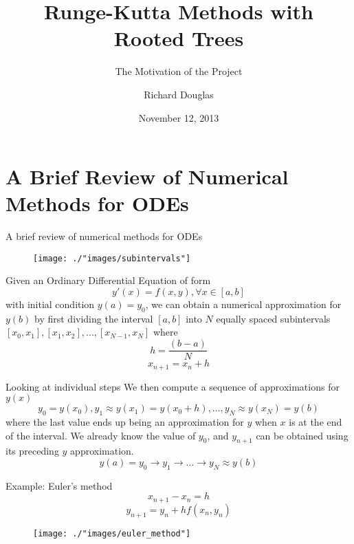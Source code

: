 \documentclass[12pt]{beamer}
\begin{document}
\title[RK Methods with Trees]{Runge-Kutta Methods with Rooted Trees}
\subtitle[motivation of project]{The Motivation of the Project}
\author[R. Douglas]{Richard Douglas}
\date[November 2013]{November 12, 2013}


\begin{frame}
  \titlepage
\end{frame}

\section[Review of Numerical Methods]{A Brief Review of Numerical Methods for ODEs}
\begin{frame}{A brief review of numerical methods for ODEs}
  \begin{figure}
    \centering
    \texttt{[image: ./"images/subintervals"]}
  \end{figure}
  Given an Ordinary Differential Equation of form
  $$y'(x) = f(x,y),  \forall x \in [a,b]$$
  with initial condition $y(a) = y_0$, \pause
  we can obtain a numerical approximation for $y(b)$ by first dividing the interval $[a,b]$ into $N$   
  equally spaced subintervals $[x_0,x_1], [x_1,x_2], ..., [x_{N-1},x_N]$ where
  $$h = \frac{(b - a)}{N}$$
  $$x_{n+1} = x_n + h$$
\end{frame}

\begin{frame}{Looking at individual steps}
  We then compute a sequence of approximations for $y(x)$ 
  $$y_0 = y(x_0), y_1 \approx y(x_1) = y(x_0 + h), \dots, y_N \approx y(x_N) = y(b)$$
  where the last value ends up being an approximation for $y$ when $x$ is at the end of the  
  interval. \newline
  \newline
  \pause
  We already know the value of $y_0$, \pause and $y_{n+1}$ can be obtained using its preceding 
  $y$ approximation.
  \pause
  $$y(a) = y_0 \to y_1\to \dots \to y_N \approx y(b)$$
\end{frame}

\begin{frame}{Example: Euler's method}
  $$x_{n+1} - x_n = h$$
  $$y_{n+1} = y_n + hf(x_n,y_n)$$
  \begin{figure}
    \centering
    \texttt{[image: ./"images/euler\_method"]}
  \end{figure}
\end{frame}
\end{document}
